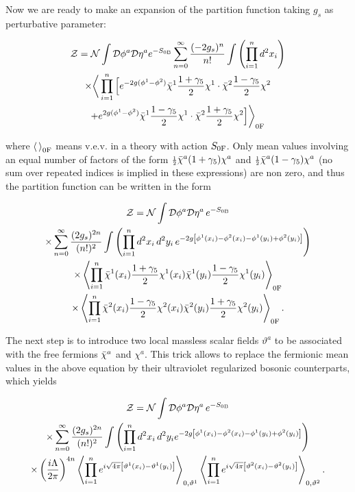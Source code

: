 \documentclass[a4paper,a4paper]{article}
\begin{document}
Now we are ready to make an expansion of the partition function taking $g_s$ as
perturbative parameter:

\begin{multline}
\mathcal{Z}=\mathcal{N}\int\mathcal{D}\phi^a\mathcal{D}\eta^a e^{-S_{0\text{B}}}
\sum_{n=0}^\infty\frac{(-2g_s)^n}{n!}\int\left(\prod_{i=1}^n d^2x_i\right)\\
\times\bigg\langle\prod_{i=1}^n\Big[e^{-2g(\phi^1-\phi^2)}\bar{\chi}^1\frac{1+\gamma_5}{2}\chi^1\cdot
\bar{\chi}^2\frac{1-\gamma_5}{2}\chi^2 \\+
e^{2g(\phi^1-\phi^2)}\bar{\chi}^1\frac{1-\gamma_5}{2}\chi^1\cdot
\bar{\chi}^2\frac{1+\gamma_5}{2}\chi^2\Big]\bigg\rangle_{0\text{F}}
\end{multline}

\noindent where $\left\langle\,\right\rangle_{0\text{F}}$ means v.e.v. in a theory with action $S_{0\text{F}}$. Only
mean values involving an equal number of factors of the form
${\scriptstyle\frac{1}{2}}\bar{\chi}^a(1+\gamma_5)\chi^a$ and ${\scriptstyle\frac{1}{2}}\bar{\chi}^a(1-\gamma_5)\chi^a$ (no sum
over repeated indices is implied in these expressions) are non zero, and thus the
partition function can be written in the form

\begin{multline}
\mathcal{Z}=\mathcal{N}\int\mathcal{D}\phi^a\mathcal{D}\eta^a\, e^{-S_{0\text{B}}}\\
\times\sum_{n=0}^\infty\frac{(2g_s)^{2n}}{(n!)^2}\int\left(\prod_{i=1}^n
d^2x_i\,d^2y_i\,
e^{-2g\left[\phi^1(x_i)-\phi^2(x_i)-\phi^1(y_i)+\phi^2(y_i)\right]}\right)
\\ \times \left\langle\prod_{i=1}^n
\bar{\chi}^1(x_i)\frac{1+\gamma_5}{2}\chi^1(x_i)
\bar{\chi}^1(y_i)\frac{1-\gamma_5}{2}\chi^1(y_i)\right\rangle_{0\text{F}}\\
\times\left\langle\prod_{i=1}^n
\bar{\chi}^2(x_i)\frac{1-\gamma_5}{2}\chi^2(x_i)
\bar{\chi}^2(y_i)\frac{1+\gamma_5}{2}\chi^2(y_i)\right\rangle_{0\text{F}}.
\end{multline}

\noindent The next step is to introduce two local massless scalar fields $\vartheta^a$
to be associated with the free fermions  $\bar{\chi}^a$ and $\chi^a$. This trick allows to
replace the fermionic mean values in the above equation by their ultraviolet
regularized bosonic counterparts, which yields

\begin{multline}
\mathcal{Z}=\mathcal{N}\int\mathcal{D}\phi^a\mathcal{D}\eta^a\,
e^{-S_{0\text{B}}}\\\times\sum_{n=0}^\infty\frac{(2g_s)^{2n}}{(n!)^2}\int\left(\prod_{i=1}^n
d^2x_i\,d^2y_i
e^{-2g\left[\phi^1(x_i)-\phi^2(x_i)-\phi^1(y_i)+\phi^2(y_i)\right]}\right)
\\\times \left(\frac{i\Lambda}{2\pi}\right)^{4n} \left\langle\prod_{i=1}^n
e^{i\sqrt{4\pi}\left[\vartheta^1(x_i)-\vartheta^1(y_i)\right]}\right\rangle_{0,\vartheta^1}
 \left\langle\prod_{i=1}^n
e^{i\sqrt{4\pi}\left[\vartheta^2(x_i)-\vartheta^2(y_i)\right]}\right\rangle_{0,\vartheta^2}.
\end{multline}
\end{document}
